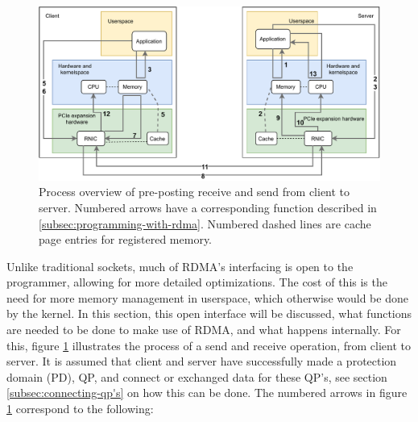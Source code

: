 \begin{figure}
    \centering
    \includegraphics[width=\columnwidth]{figures/PDF/RDAM_SEND_RECV_drawing}
    \caption[Process overview of SEND and RECV.]{Process overview of pre-posting receive and send from client to server. Numbered arrows have a corresponding function described in \ref{subsec:programming-with-rdma}. Numbered dashed lines are cache page entries for registered memory.}
    \label{fig:send_recv_drawing}
\end{figure}

Unlike traditional sockets, much of RDMA's interfacing is open to the programmer, allowing for more detailed optimizations.
The cost of this is the need for more memory management in userspace, which otherwise would be done by the kernel.
In this section, this open interface will be discussed, what functions are needed to be done to make use of RDMA, and what happens internally.
For this, figure \ref{fig:send_recv_drawing} illustrates the process of a send and receive operation, from client to server.
It is assumed that client and server have successfully made a protection domain (PD), QP, and connect or exchanged data for these QP's, see section \ref{subsec:connecting-qp's} on how this can be done.
The numbered arrows in figure \ref{fig:send_recv_drawing} correspond to the following:

